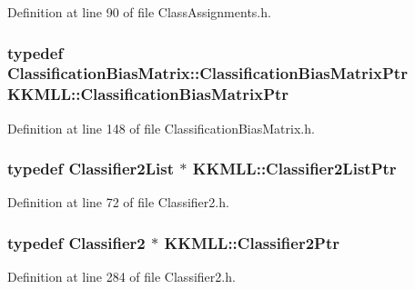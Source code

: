 Definition at line 90 of file Class\+Assignments.\+h.

\subsubsection[{\texorpdfstring{Classification\+Bias\+Matrix\+Ptr}{ClassificationBiasMatrixPtr}}]{\setlength{\rightskip}{0pt plus 5cm}typedef {\bf Classification\+Bias\+Matrix\+::\+Classification\+Bias\+Matrix\+Ptr} {\bf K\+K\+M\+L\+L\+::\+Classification\+Bias\+Matrix\+Ptr}}\hypertarget{namespace_k_k_m_l_l_a547d5168c662f2379d406e8deb194f39}{}\label{namespace_k_k_m_l_l_a547d5168c662f2379d406e8deb194f39}


Definition at line 148 of file Classification\+Bias\+Matrix.\+h.

\subsubsection[{\texorpdfstring{Classifier2\+List\+Ptr}{Classifier2ListPtr}}]{\setlength{\rightskip}{0pt plus 5cm}typedef {\bf Classifier2\+List} $\ast$ {\bf K\+K\+M\+L\+L\+::\+Classifier2\+List\+Ptr}}\hypertarget{namespace_k_k_m_l_l_a8ec551ed7084d7a34afeff539e76f399}{}\label{namespace_k_k_m_l_l_a8ec551ed7084d7a34afeff539e76f399}


Definition at line 72 of file Classifier2.\+h.

\subsubsection[{\texorpdfstring{Classifier2\+Ptr}{Classifier2Ptr}}]{\setlength{\rightskip}{0pt plus 5cm}typedef {\bf Classifier2} $\ast$ {\bf K\+K\+M\+L\+L\+::\+Classifier2\+Ptr}}\hypertarget{namespace_k_k_m_l_l_ae49327d641e08f01c40df84678fad11e}{}\label{namespace_k_k_m_l_l_ae49327d641e08f01c40df84678fad11e}


Definition at line 284 of file Classifier2.\+h.

